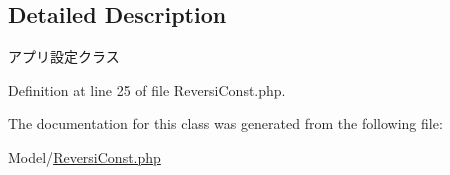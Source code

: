\subsection{Detailed Description}
アプリ設定クラス 

Definition at line 25 of file Reversi\+Const.\+php.



The documentation for this class was generated from the following file\+:\begin{DoxyCompactItemize}
\item 
Model/\hyperlink{_reversi_const_8php}{Reversi\+Const.\+php}\end{DoxyCompactItemize}
